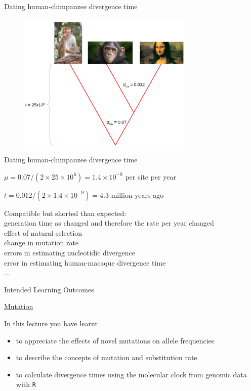 \begin{frame}{Dating human-chimpanzee divergence time}

	\begin{figure}
        	\includegraphics[width=0.75\textwidth]{Pics/dating}
        \end{figure}

\end{frame}


\begin{frame}{Dating human-chimpanzee divergence time}

	$\mu = 0.07 / (2 \times 25 \times 10^6) = 1.4 \times 10^{-9}$ per site per year

	\bigskip

	$t = 0.012 / (2 \times 1.4 \times 10^{-9}) = 4.3$ million years ago

	\bigskip

	\small

	Compatible but shorted than expected: \\
	generation time as changed and therefore the rate per year changed \\
	effect of natural selection \\
	change in mutation rate \\
	errors in estimating nucleotidic divergence \\
	error in estimating human-macaque divergence time \\
	...
	
\end{frame}


\begin{frame}{Intended Learning Outcomes}

        \underline{Mutation}

	\bigskip

        In this lecture you have learnt
        \begin{itemize}
                \item to appreciate the effects of novel mutations on allele frequencies
                \item to describe the concepts of mutation and substitution rate
                \item to calculate divergence times using the molecular clock from genomic data with \texttt{R}
        \end{itemize}

\end{frame}


